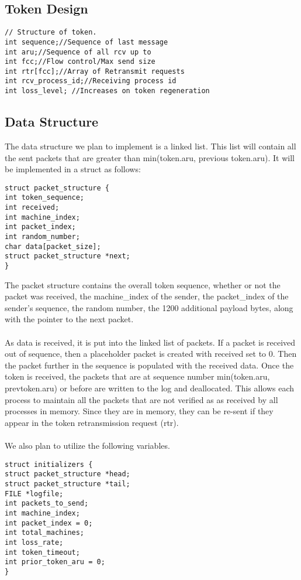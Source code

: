 \documentclass[12pt,journal,compsoc]{IEEEtran}
\begin{document}
\subsection{Token Design}
\begin{lstlisting}
// Structure of token.
int sequence;//Sequence of last message
int aru;//Sequence of all rcv up to
int fcc;//Flow control/Max send size
int rtr[fcc];//Array of Retransmit requests
int rcv_process_id;//Receiving process id
int loss_level; //Increases on token regeneration
\end{lstlisting}
\subsection{Data Structure}
The data structure we plan to implement is a linked list. This list will contain all the sent packets that are greater than min(token.aru, previous token.aru). It will be implemented in a struct as follows:
\begin{lstlisting}
struct packet_structure {
int token_sequence;
int received;
int machine_index;
int packet_index;
int random_number;
char data[packet_size];
struct packet_structure *next;
}
\end{lstlisting}
The packet structure contains the overall token sequence, whether or not the packet was received, the machine\_index of the sender, the packet\_index of the sender's sequence, the random number, the 1200 additional payload bytes, along with the pointer to the next packet.\\
\\
As data is received, it is put into the linked list of packets. If a packet is received out of sequence, then a placeholder packet is created with received set to 0. Then the packet further in the sequence is populated with the received data. Once the token is received, the packets that are at sequence number min(token.aru, prevtoken.aru) or before are written to the log and deallocated. This allows each process to maintain all the packets that are not verified as as received by all processes in memory. Since they are in memory, they can be re-sent if they appear in the token retransmission request (rtr).\\
\\
We also plan to utilize the following variables.\\
\begin{verbatim}
struct initializers {
struct packet_structure *head;
struct packet_structure *tail;
FILE *logfile;
int packets_to_send;
int machine_index;
int packet_index = 0;
int total_machines;
int loss_rate;
int token_timeout;
int prior_token_aru = 0;
}
\end{verbatim}
\end{document}
